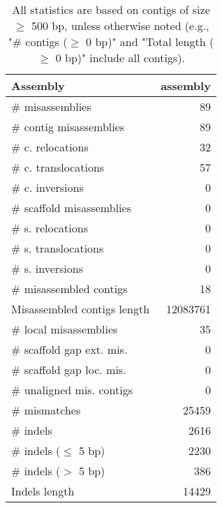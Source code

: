\documentclass[12pt,a4paper]{article}
\begin{document}
\begin{table}[ht]
\begin{center}
\caption{All statistics are based on contigs of size $\geq$ 500 bp, unless otherwise noted (e.g., "\# contigs ($\geq$ 0 bp)" and "Total length ($\geq$ 0 bp)" include all contigs).}
\begin{tabular}{|l*{1}{|r}|}
\hline
Assembly & assembly \\ \hline
\# misassemblies & 89 \\ \hline
\hspace{2mm}\# contig misassemblies & 89 \\ \hline
\hspace{5mm}\# c. relocations & 32 \\ \hline
\hspace{5mm}\# c. translocations & 57 \\ \hline
\hspace{5mm}\# c. inversions & 0 \\ \hline
\hspace{2mm}\# scaffold misassemblies & 0 \\ \hline
\hspace{5mm}\# s. relocations & 0 \\ \hline
\hspace{5mm}\# s. translocations & 0 \\ \hline
\hspace{5mm}\# s. inversions & 0 \\ \hline
\# misassembled contigs & 18 \\ \hline
Misassembled contigs length & 12083761 \\ \hline
\# local misassemblies & 35 \\ \hline
\# scaffold gap ext. mis. & 0 \\ \hline
\# scaffold gap loc. mis. & 0 \\ \hline
\# unaligned mis. contigs & 0 \\ \hline
\# mismatches & 25459 \\ \hline
\# indels & 2616 \\ \hline
\hspace{5mm}\# indels ($\leq$ 5 bp) & 2230 \\ \hline
\hspace{5mm}\# indels ($>$ 5 bp) & 386 \\ \hline
Indels length & 14429 \\ \hline
\end{tabular}
\end{center}
\end{table}
\end{document}
